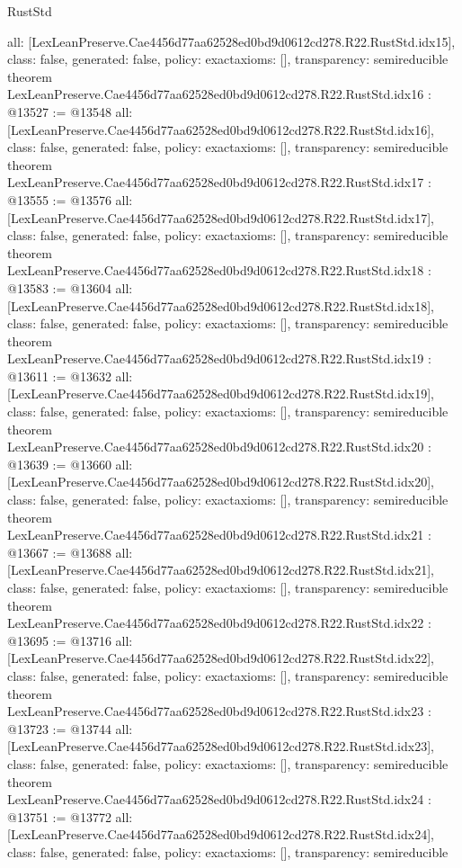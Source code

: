 \begin{lexlean}{RustStd}
\begin{coremodule}
{  all: [LexLeanPreserve.Cae4456d77aa62528ed0bd9d0612cd278.R22.RustStd.idx15],
  class: false,
  generated: false,
  policy: exact{axioms: []},
  transparency: semireducible
}
theorem LexLeanPreserve.Cae4456d77aa62528ed0bd9d0612cd278.R22.RustStd.idx16 : @13527 := @13548 {
  all: [LexLeanPreserve.Cae4456d77aa62528ed0bd9d0612cd278.R22.RustStd.idx16],
  class: false,
  generated: false,
  policy: exact{axioms: []},
  transparency: semireducible
}
theorem LexLeanPreserve.Cae4456d77aa62528ed0bd9d0612cd278.R22.RustStd.idx17 : @13555 := @13576 {
  all: [LexLeanPreserve.Cae4456d77aa62528ed0bd9d0612cd278.R22.RustStd.idx17],
  class: false,
  generated: false,
  policy: exact{axioms: []},
  transparency: semireducible
}
theorem LexLeanPreserve.Cae4456d77aa62528ed0bd9d0612cd278.R22.RustStd.idx18 : @13583 := @13604 {
  all: [LexLeanPreserve.Cae4456d77aa62528ed0bd9d0612cd278.R22.RustStd.idx18],
  class: false,
  generated: false,
  policy: exact{axioms: []},
  transparency: semireducible
}
theorem LexLeanPreserve.Cae4456d77aa62528ed0bd9d0612cd278.R22.RustStd.idx19 : @13611 := @13632 {
  all: [LexLeanPreserve.Cae4456d77aa62528ed0bd9d0612cd278.R22.RustStd.idx19],
  class: false,
  generated: false,
  policy: exact{axioms: []},
  transparency: semireducible
}
theorem LexLeanPreserve.Cae4456d77aa62528ed0bd9d0612cd278.R22.RustStd.idx20 : @13639 := @13660 {
  all: [LexLeanPreserve.Cae4456d77aa62528ed0bd9d0612cd278.R22.RustStd.idx20],
  class: false,
  generated: false,
  policy: exact{axioms: []},
  transparency: semireducible
}
theorem LexLeanPreserve.Cae4456d77aa62528ed0bd9d0612cd278.R22.RustStd.idx21 : @13667 := @13688 {
  all: [LexLeanPreserve.Cae4456d77aa62528ed0bd9d0612cd278.R22.RustStd.idx21],
  class: false,
  generated: false,
  policy: exact{axioms: []},
  transparency: semireducible
}
theorem LexLeanPreserve.Cae4456d77aa62528ed0bd9d0612cd278.R22.RustStd.idx22 : @13695 := @13716 {
  all: [LexLeanPreserve.Cae4456d77aa62528ed0bd9d0612cd278.R22.RustStd.idx22],
  class: false,
  generated: false,
  policy: exact{axioms: []},
  transparency: semireducible
}
theorem LexLeanPreserve.Cae4456d77aa62528ed0bd9d0612cd278.R22.RustStd.idx23 : @13723 := @13744 {
  all: [LexLeanPreserve.Cae4456d77aa62528ed0bd9d0612cd278.R22.RustStd.idx23],
  class: false,
  generated: false,
  policy: exact{axioms: []},
  transparency: semireducible
}
theorem LexLeanPreserve.Cae4456d77aa62528ed0bd9d0612cd278.R22.RustStd.idx24 : @13751 := @13772 {
  all: [LexLeanPreserve.Cae4456d77aa62528ed0bd9d0612cd278.R22.RustStd.idx24],
  class: false,
  generated: false,
  policy: exact{axioms: []},
  transparency: semireducible
}
\end{coremodule}
\end{lexlean}
